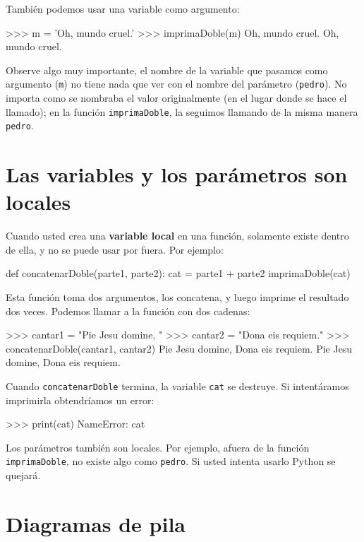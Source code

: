 También podemos usar una variable como argumento:

\begin{pyconcode}
>>> m = 'Oh, mundo cruel.'
>>> imprimaDoble(m)
Oh, mundo cruel. Oh, mundo cruel.
\end{pyconcode}
 Observe algo muy importante, el nombre de la variable que pasamos
como argumento (\texttt{m}) no tiene nada que ver con el nombre del
parámetro (\texttt{pedro}). No importa como se nombraba el valor originalmente
(en el lugar donde se hace el llamado); en la función \texttt{imprimaDoble},
la seguimos llamando de la misma manera \texttt{pedro}.

\section{Las variables y los parámetros son locales}

 

Cuando usted crea una \textbf{variable local} en una función, solamente
existe dentro de ella, y no se puede usar por fuera. Por ejemplo:

\begin{pythoncode}
def concatenarDoble(parte1, parte2):
  cat = parte1 + parte2
  imprimaDoble(cat)
\end{pythoncode}
 Esta función toma dos argumentos, los concatena, y luego imprime
el resultado dos veces. Podemos llamar a la función con dos cadenas:

\begin{pyconcode}
>>> cantar1 = "Pie Jesu domine, "
>>> cantar2 = "Dona eis requiem."
>>> concatenarDoble(cantar1, cantar2)
Pie Jesu domine, Dona eis requiem. Pie Jesu domine, Dona 
eis requiem.
\end{pyconcode}

Cuando \texttt{concatenarDoble} termina, la variable \texttt{cat}
se destruye. Si intentáramos imprimirla obtendríamos un error:

\begin{pyconcode}
>>> print(cat)
NameError: cat
\end{pyconcode}
 Los parámetros también son locales. Por ejemplo, afuera de la función
\texttt{imprimaDoble}, no existe algo como \texttt{pedro}. Si usted
intenta usarlo Python se quejará.

\section{Diagramas de pila}

